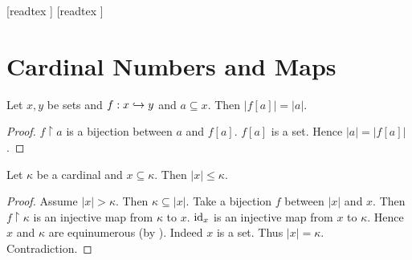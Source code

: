 \documentclass[10pt]{article}
\begin{document}
  \begin{imports}
    \begin{forthel}
      [readtex ]
      [readtex ]
    \end{forthel}
  \end{imports}


  \section*{Cardinal Numbers and Maps}  

  \begin{forthel}
    \begin{proposition}
      Let $x, y$ be sets and $f : x \hookrightarrow y$ and $a \subseteq x$.
      Then $|f[a]| = |a|$.
    \end{proposition}
    \begin{proof}
      $f \restriction a$ is a bijection between $a$ and $f[a]$.
      $f[a]$ is a set.
      Hence $|a| = |f[a]|$.
    \end{proof}
  \end{forthel}

  \begin{forthel}
    \begin{proposition}
      Let $\kappa$ be a cardinal and $x \subseteq \kappa$.
      Then $|x| \leq \kappa$.
    \end{proposition}
    \begin{proof}
      Assume $|x| > \kappa$.
      Then $\kappa \subseteq |x|$.
      Take a bijection $f$ between $|x|$ and $x$.
      Then $f \restriction \kappa$ is an injective map from $\kappa$ to $x$.
      $\textrm{id}_{x}$ is an injective map from $x$ to $\kappa$.
      Hence $x$ and $\kappa$ are equinumerous (by ).
      Indeed $x$ is a set.
      Thus $|x| = \kappa$.
      Contradiction.
    \end{proof}
  \end{forthel}
\end{document}
